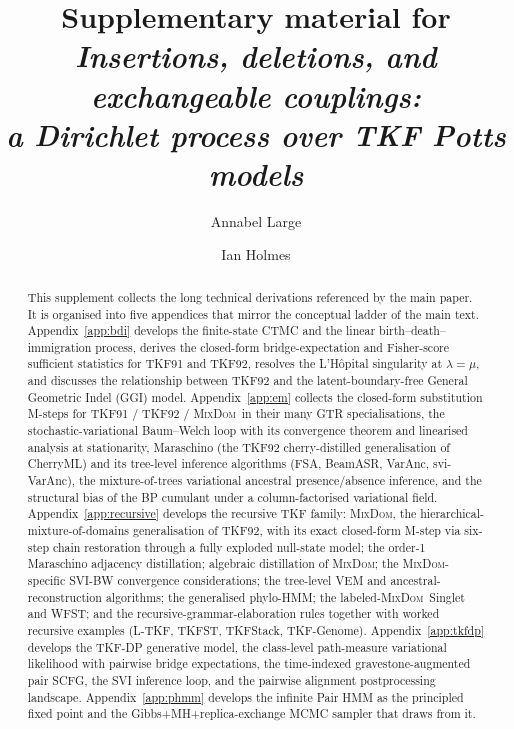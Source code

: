 \documentclass[11pt]{article}
\title{Supplementary material for\\\emph{Insertions, deletions, and exchangeable couplings:\\a Dirichlet process over TKF Potts models}}
\author{Annabel Large}
\author{Ian Holmes}
\affil{Department of Bioengineering, University of California, Berkeley\\
       \texttt{\{annabel\_large, ihh\}@berkeley.edu}}
\date{}
\theoremstyle{remark}
\newcommand\insrate{\lambda}
\newcommand\delrate{\mu}
\newcommand{\MixDom}{\textsc{MixDom}}
\numberwithin{equation}{section}
\numberwithin{figure}{section}
\numberwithin{table}{section}
\begin{document}
\maketitle

\begin{abstract}
\noindent
This supplement collects the long technical derivations referenced
by the main paper. It is organised into five appendices that mirror
the conceptual ladder of the main text. Appendix~\ref{app:bdi}
develops the finite-state CTMC and the linear birth--death--immigration
process, derives the closed-form bridge-expectation and Fisher-score
sufficient statistics for TKF91 and TKF92, resolves the L'H\^opital
singularity at $\insrate{}={}\delrate$, and discusses the
relationship between TKF92 and the latent-boundary-free General
Geometric Indel (GGI) model. Appendix~\ref{app:em} collects the
closed-form substitution M-steps for TKF91 / TKF92 / \MixDom\ in
their many GTR specialisations, the stochastic-variational
Baum--Welch loop with its convergence theorem and linearised
analysis at stationarity, Maraschino (the TKF92 cherry-distilled
generalisation of CherryML) and its tree-level inference algorithms
(FSA, BeamASR, VarAnc, svi-VarAnc), the mixture-of-trees
variational ancestral presence/absence inference, and the
structural bias of the BP cumulant under a column-factorised
variational field. Appendix~\ref{app:recursive} develops the
recursive TKF family: \MixDom, the
hierarchical-mixture-of-domains generalisation of TKF92, with its
exact closed-form M-step via six-step chain restoration through a
fully exploded null-state model; the order-1 Maraschino adjacency
distillation; algebraic distillation of \MixDom; the
\MixDom-specific SVI-BW convergence considerations; the tree-level
VEM and ancestral-reconstruction algorithms; the generalised
phylo-HMM; the labeled-\MixDom\ Singlet and WFST; and the
recursive-grammar-elaboration rules together with worked recursive
examples (L-TKF, TKFST, TKFStack, TKF-Genome).
Appendix~\ref{app:tkfdp} develops the TKF-DP generative model, the
class-level path-measure variational likelihood with pairwise
bridge expectations, the time-indexed gravestone-augmented pair SCFG,
the SVI inference loop, and the pairwise alignment postprocessing
landscape. Appendix~\ref{app:phmm} develops the infinite Pair HMM
as the principled fixed point and the Gibbs+MH+replica-exchange
MCMC sampler that draws from it.
\end{abstract}

\tableofcontents
\clearpage
\end{document}
